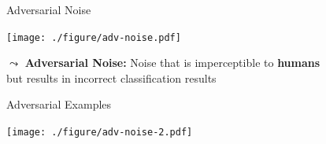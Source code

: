 \documentclass[aspectratio=169]{../latex_main/tntbeamer}  %
\begin{document}
	
\begin{frame}[c]{Adversarial Noise~}
    
    \centering
    \texttt{[image: ./figure/adv-noise.pdf]}
	
	$\leadsto$ \textbf{Adversarial Noise:} Noise that is imperceptible to \textbf{humans}\\ but results in incorrect classification results
	
\end{frame}

\begin{frame}[c]{Adversarial Examples~}
    
    \centering
    \texttt{[image: ./figure/adv-noise-2.pdf]}
	
\end{frame}
\end{document}
